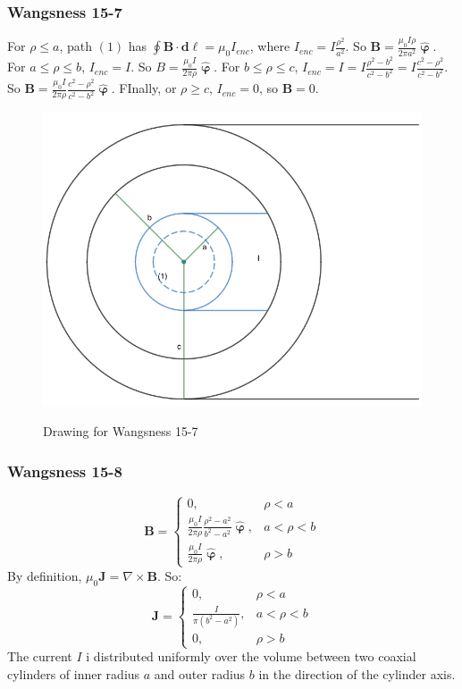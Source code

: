 \documentclass[oneside]{book}
\theoremstyle{mystyle}
\begin{document}
\subsubsection{Wangsness 15-7}
For $\rho\leq a$, path $(1)$ has $\oint \mathbf{B}\cdot \mathbf{d\ell}= \mu_0 I_{enc}$, where $I_{enc} = I\frac{\rho^2}{a^2}$. So $\mathbf{B} = \frac{\mu_0 I\rho}{2\pi a^2} \hat{\boldsymbol{\upvarphi}}$. For $a\leq \rho \leq b$, $I_{enc} = I$. So $B = \frac{\mu_0 I}{2\pi \rho} \hat{\boldsymbol{\upvarphi}}$. For $b\leq \rho \leq c$, $I_{enc} = I =I\frac{\rho^2-b^2}{c^2-b^2} = I\frac{c^2-\rho^2}{c^2-b^2}$. So $\mathbf{B} = \frac{\mu_0 I}{2\pi \rho} \frac{c^2-\rho^2}{c^2-b^2}\hat{\boldsymbol{\upvarphi}}$. FInally, or $\rho \geq c$, $I_{enc} = 0$, so $\mathbf{B} = 0$.
\begin{figure}[htbp]
    \centering
    {\includegraphics[scale=0.4]{15-7.png}}
    \caption{Drawing for Wangsness 15-7}
\end{figure}
\subsubsection{Wangsness 15-8}
\begin{equation*}
    \mathbf{B} = \begin{cases} 0, & \rho < a \\ \frac{\mu_0 I}{2\pi \rho}\frac{\rho^2-a^2}{b^2-a^2}\hat{\boldsymbol{\upvarphi}}, & a<\rho < b \\ \frac{\mu_0 I}{2\pi \rho} \hat{\boldsymbol{\upvarphi}}, & \rho>b\end{cases}    
\end{equation*}
By definition, $\mu_0 \mathbf{J} = \nabla \times \mathbf{B}$. So:
\begin{equation*}
    \mathbf{J} = \begin{cases} 0, & \rho<a\\ \frac{I}{\pi(b^2-a^2)}, & a<\rho < b\\ 0, & \rho>b \end{cases}    
\end{equation*}
The current $I$ i distributed uniformly over the volume between two coaxial cylinders of inner radius $a$ and outer radius $b$ in the direction of the cylinder axis.
\end{document}

